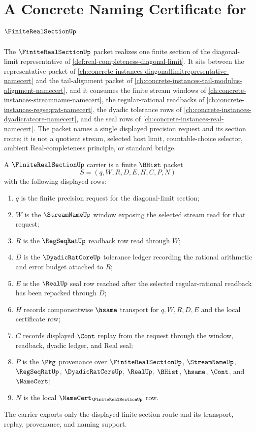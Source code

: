 \chapter{A Concrete Naming Certificate for $\FiniteRealSectionUp$}
\label{ch:concrete-instances-finite-real-section-namecert}

The $\FiniteRealSectionUp$ packet realizes one finite section of the diagonal-limit representative of \autoref{def:real-completeness-diagonal-limit}. It sits between the representative packet of \autoref{ch:concrete-instances-diagonallimitrepresentative-namecert} and the tail-alignment packet of \autoref{ch:concrete-instances-tail-modulus-alignment-namecert}, and it consumes the finite stream windows of \autoref{ch:concrete-instances-streamname-namecert}, the regular-rational readbacks of \autoref{ch:concrete-instances-regseqrat-namecert}, the dyadic tolerance rows of \autoref{ch:concrete-instances-dyadicratcore-namecert}, and the seal rows of \autoref{ch:concrete-instances-real-namecert}. The packet names a single displayed precision request and its section route; it is not a quotient stream, selected host limit, countable-choice selector, ambient Real-completeness principle, or standard bridge.

\begin{definition}
\label{def:finite-real-section-carrier}
A $\FiniteRealSectionUp$ carrier is a finite $\BHist$ packet
$$
S=(q,W,R,D,E,H,C,P,N)
$$
with the following displayed rows:
\begin{enumerate}
\item $q$ is the finite precision request for the diagonal-limit section;
\item $W$ is the $\StreamNameUp$ window exposing the selected stream read for that request;
\item $R$ is the $\RegSeqRatUp$ readback row read through $W$;
\item $D$ is the $\DyadicRatCoreUp$ tolerance ledger recording the rational arithmetic and error budget attached to $R$;
\item $E$ is the $\RealUp$ seal row reached after the selected regular-rational readback has been repacked through $D$;
\item $H$ records componentwise $\hsame$ transport for $q,W,R,D,E$ and the local certificate row;
\item $C$ records displayed $\Cont$ replay from the request through the window, readback, dyadic ledger, and Real seal;
\item $P$ is the $\Pkg$ provenance over $\FiniteRealSectionUp$, $\StreamNameUp$, $\RegSeqRatUp$, $\DyadicRatCoreUp$, $\RealUp$, $\BHist$, $\hsame$, $\Cont$, and $\NameCert$;
\item $N$ is the local $\NameCert_{\FiniteRealSectionUp}$ row.
\end{enumerate}
The carrier exports only the displayed finite-section route and its transport, replay, provenance, and naming support.
\end{definition}

